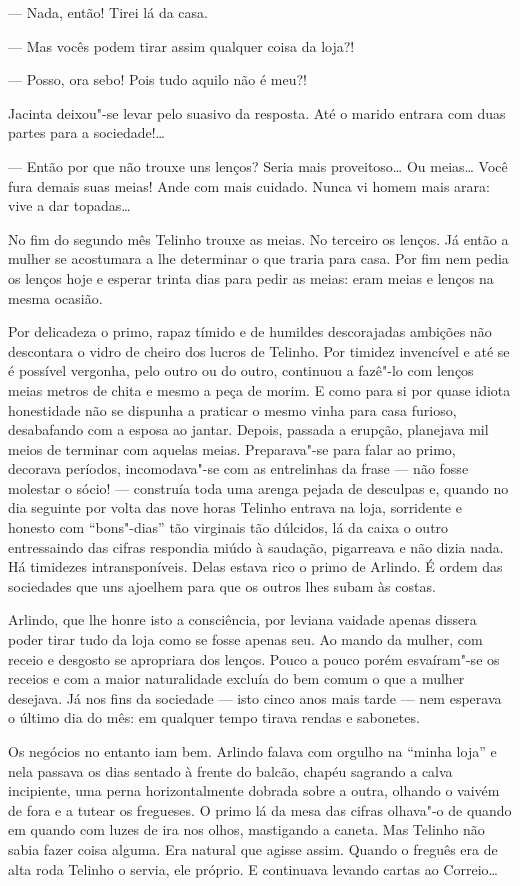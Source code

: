 \begin{linenumbers}
--- Nada, então! Tirei lá da casa.

--- Mas vocês podem tirar assim qualquer coisa da loja?!

--- Posso, ora sebo! Pois tudo aquilo não é meu?!

Jacinta deixou"-se levar pelo suasivo da resposta. Até o marido entrara
com duas partes para a sociedade!\ldots{}

--- Então por que não trouxe uns lenços? Seria mais proveitoso\ldots{} Ou
meias\ldots{} Você fura demais suas meias! Ande com mais cuidado. Nunca vi
homem mais arara: vive a dar topadas\ldots{}

No fim do segundo mês Telinho trouxe as meias. No terceiro os lenços. Já
então a mulher se acostumara a lhe determinar o que traria para casa.
Por fim nem pedia os lenços hoje e esperar trinta dias para pedir as
meias: eram meias e lenços na mesma ocasião.

Por delicadeza o primo, rapaz tímido e de humildes descorajadas ambições
não descontara o vidro de cheiro dos lucros de Telinho. Por timidez
invencível e até se é possível vergonha, pelo outro ou do outro,
continuou a fazê"-lo com lenços meias metros de chita e mesmo a peça de
morim. E como para si por quase idiota honestidade não se dispunha a
praticar o mesmo vinha para casa furioso, desabafando com a esposa ao
jantar. Depois, passada a erupção, planejava mil meios de terminar com
aquelas meias. Preparava"-se para falar ao primo, decorava períodos,
incomodava"-se com as entrelinhas da frase --- não fosse molestar o sócio!
--- construía toda uma arenga pejada de desculpas e, quando no dia
seguinte por volta das nove horas Telinho entrava na loja, sorridente e
honesto com ``bons"-dias'' tão virginais tão dúlcidos, lá da caixa o
outro entressaindo das cifras respondia miúdo à saudação, pigarreava e
não dizia nada. Há timidezes intransponíveis. Delas estava rico o primo
de Arlindo.
É ordem das sociedades que uns ajoelhem para que os outros lhes subam às
costas.

Arlindo, que lhe honre isto a consciência, por leviana vaidade apenas
dissera poder tirar tudo da loja como se fosse apenas seu. Ao mando da
mulher, com receio e desgosto se apropriara dos lenços. Pouco a pouco
porém esvaíram"-se os receios e com a maior naturalidade excluía do bem
comum o que a mulher desejava. Já nos fins da sociedade --- isto cinco
anos mais tarde --- nem esperava o último dia do mês: em qualquer tempo
tirava rendas e sabonetes.

Os negócios no entanto iam bem. Arlindo falava com orgulho na ``minha
loja'' e nela passava os dias sentado à frente do balcão, chapéu
sagrando a calva incipiente, uma perna horizontalmente dobrada sobre a
outra, olhando o vaivém de fora e a tutear os fregueses. O primo lá da
mesa das cifras olhava"-o de quando em quando com luzes de ira nos olhos,
mastigando a caneta. Mas Telinho não sabia fazer coisa alguma. Era
natural que agisse assim. Quando o freguês era de alta roda Telinho o
servia, ele próprio. E continuava levando cartas ao Correio\ldots{}


\end{linenumbers}
